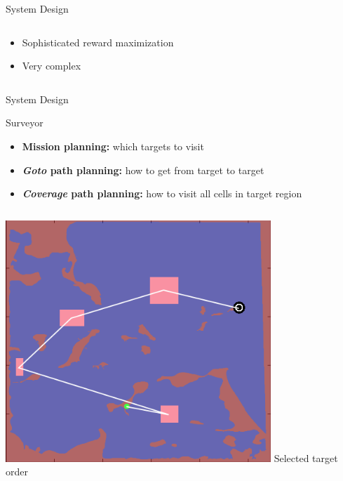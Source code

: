 \documentclass[9pt]{beamer}
\begin{document}
\begin{frame}{System Design}
\begin{columns}
\begin{column}{0.5\textwidth}
\begin{center}
                \begin{itemize}
                        \item Sophisticated reward maximization
    	                \item Very complex
                \end{itemize}  
            \end{center}
        \end{column}
    \end{columns}    
\end{frame}

\begin{frame}{System Design}
    \begin{block}{Surveyor}
        \begin{itemize}
            \item \textbf{Mission planning:} which targets to visit
    	    \item \textbf{\textit{Goto} path planning:} how to get from target to target
    	    \item \textbf{\textit{Coverage} path planning:} how to visit all cells in target region
        \end{itemize}  
    \end{block}
    \begin{columns}
        \begin{column}{0.5\textwidth}
            \begin{center}
                \includegraphics[width=0.75\textwidth,trim={0cm 0cm 0cm 0cm},clip]{img/surveyor_1.png}
                \newline
                Selected target order
            \end{center}

\end{column}
\end{columns}
\end{frame}
\end{document}

